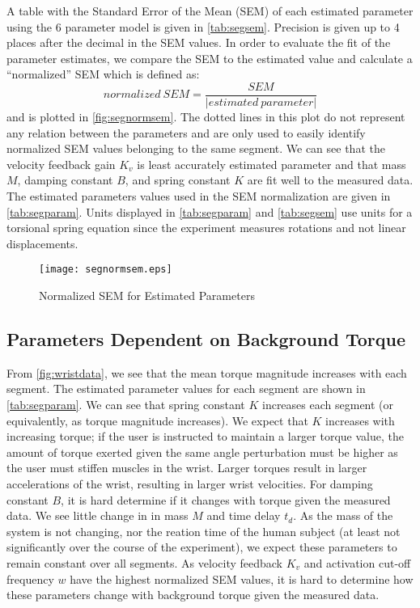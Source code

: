 \documentclass[11pt,a4paper]{article}
\begin{document}
A table with the Standard Error of the Mean (SEM) of each estimated parameter
using the 6 parameter model is given in \autoref{tab:segsem}. Precision is
given up to 4 places after the decimal in the SEM values. In order to evaluate
the fit of the parameter estimates, we compare the SEM to the estimated value
and calculate a ``normalized'' SEM which is defined as:
\begin{equation*}
    normalized \: SEM = \frac{SEM}{|estimated \: parameter|}
\end{equation*}
and is plotted in \autoref{fig:segnormsem}. The dotted lines in this plot do
not represent any relation between the parameters and are only used to easily
identify normalized SEM values belonging to the same segment. We can see that
the velocity feedback gain $K_v$ is least accurately estimated parameter and
that mass $M$, damping constant $B$, and spring constant $K$ are fit well to
the measured data. The estimated parameters values used in the SEM
normalization are given in \autoref{tab:segparam}. Units displayed in
\autoref{tab:segparam} and \autoref{tab:segsem} use units for a torsional
spring equation since the experiment measures rotations and not linear
displacements.

\begin{figure}
    \centering
    \texttt{[image: segnormsem.eps]}
    \caption{Normalized SEM for Estimated Parameters}
    \label{fig:segnormsem}
\end{figure}


\subsection{Parameters Dependent on Background Torque}
From \autoref{fig:wristdata}, we see that the mean torque magnitude increases with each
segment. The estimated parameter values for each segment are shown in
\autoref{tab:segparam}. We can see that spring constant $K$ increases each
segment (or equivalently, as torque magnitude increases). We expect that $K$
increases with increasing torque; if the user is instructed to maintain a
larger torque value, the amount of torque exerted given the same angle
perturbation must be higher as the user must stiffen muscles in the wrist.
Larger torques result in larger accelerations of the wrist, resulting in larger
wrist velocities. For damping constant $B$, it is hard determine if it changes
with torque given the measured data. We see little change in in mass $M$ and
time delay $t_d$. As the mass of the system is not changing, nor the reation
time of the human subject (at least not significantly over the course of the
experiment), we expect these parameters to remain constant over all segments.
As velocity feedback $K_v$ and activation cut-off frequency $w$ have the
highest normalized SEM values, it is hard to determine how these parameters
change with background torque given the measured data.
\end{document}
